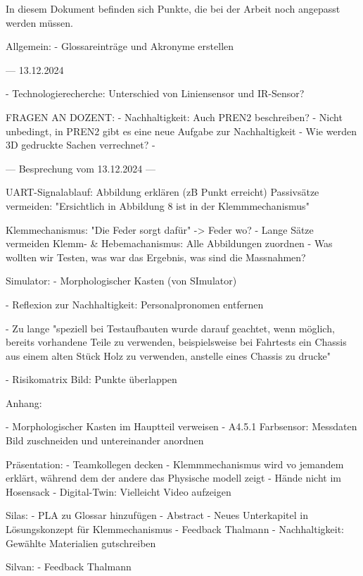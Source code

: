 
In diesem Dokument befinden sich Punkte, die bei der Arbeit noch angepasst werden müssen.

Allgemein:
- Glossareinträge und Akronyme erstellen



--- 13.12.2024

- Technologierecherche: Unterschied von Liniensensor und IR-Sensor?




FRAGEN AN DOZENT:
- Nachhaltigkeit: Auch PREN2 beschreiben?
  - Nicht unbedingt, in PREN2 gibt es eine neue Aufgabe zur Nachhaltigkeit
- Wie werden 3D gedruckte Sachen verrechnet?
  - 


--- Besprechung vom 13.12.2024 ---

UART-Signalablauf: Abbildung erklären (zB Punkt erreicht)
Passivsätze vermeiden: "Ersichtlich in Abbildung 8 ist in der Klemmmechanismus"

Klemmechanismus: "Die Feder  sorgt dafür" -> Feder wo?
- Lange Sätze vermeiden
Klemm- \& Hebemachanismus: Alle Abbildungen zuordnen
- Was wollten wir Testen, was  war das Ergebnis, was sind die Massnahmen?

Simulator:
- Morphologischer Kasten (von SImulator)



- Reflexion zur Nachhaltigkeit: Personalpronomen entfernen

- Zu lange "speziell bei Testaufbauten wurde darauf geachtet, wenn möglich, bereits
vorhandene Teile zu verwenden, beispielsweise bei Fahrtests ein Chassis aus einem alten Stück Holz zu verwenden, anstelle eines Chassis zu drucke"

- Risikomatrix Bild: Punkte überlappen

Anhang:

- Morphologischer Kasten im Hauptteil verweisen
- A4.5.1 Farbsensor: Messdaten Bild zuschneiden und untereinander anordnen


Präsentation:
- Teamkollegen decken
- Klemmmechanismus wird vo jemandem erklärt, während dem der andere das Physische modell zeigt
- Hände nicht im Hosensack
- Digital-Twin: Vielleicht Video aufzeigen



Silas:
- PLA zu Glossar hinzufügen
- Abstract
- Neues Unterkapitel in Lösungskonzept für Klemmechanismus
- Feedback Thalmann
- Nachhaltigkeit: Gewählte Materialien gutschreiben

Silvan:
- Feedback Thalmann

